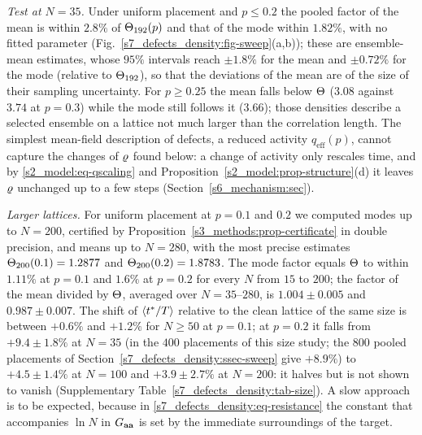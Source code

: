 \emph{Test at $N=35$.} Under uniform placement and $p\le0.2$ the pooled factor of the mean is within $2.8\%$ of
$\Theta_{192}(p)$ and that of the mode within $1.82\%$, with no fitted parameter (Fig.~\ref{s7_defects_density:fig-sweep}(a,b));
these are ensemble-mean estimates, whose $95\%$ intervals reach $\pm1.8\%$ for the mean and $\pm0.72\%$ for the mode
(relative to $\Theta_{192}$), so that the deviations of the mean are of the size of their sampling uncertainty.
For $p\ge0.25$ the mean falls below $\Theta$ ($3.08$ against $3.74$ at $p=0.3$) while the mode still follows it ($3.66$);
those densities describe a selected ensemble on a lattice not much larger than the correlation length. The simplest
mean-field description of defects, a reduced activity $q_{\mathrm{eff}}(p)$, cannot capture the changes of $\varrho$ found
below: a change of activity only rescales time, and by \eqref{s2_model:eq-qscaling} and
Proposition~\ref{s2_model:prop-structure}(d) it leaves $\varrho$ unchanged up to a few steps
(Section~\ref{s6_mechanism:sec}).

\emph{Larger lattices.} For uniform placement at $p=0.1$ and $0.2$ we computed modes up to $N=200$, certified by
Proposition~\ref{s3_methods:prop-certificate} in double precision, and means up to $N=280$, with the most precise estimates $\Theta_{200}(0.1)=1.2877$ and $\Theta_{200}(0.2)=1.8783$. The mode factor equals
$\Theta$ to within $1.11\%$ at $p=0.1$ and $1.6\%$ at $p=0.2$ for every $N$ from $15$ to $200$; the factor of the mean divided by
$\Theta$, averaged over $N=35$--$280$, is $1.004\pm0.005$ and $0.987\pm0.007$. The shift of $\langle t^{*}/T\rangle$ relative
to the clean lattice of the same size is between $+0.6\%$ and $+1.2\%$ for $N\ge50$ at $p=0.1$; at $p=0.2$ it falls from
$+9.4\pm1.8\%$ at $N=35$ (in the $400$ placements of this size study; the $800$ pooled placements of Section~\ref{s7_defects_density:ssec-sweep} give $+8.9\%$) to $+4.5\pm1.4\%$ at $N=100$ and $+3.9\pm2.7\%$ at $N=200$: it halves but is not shown to vanish
(Supplementary Table~\ref{s7_defects_density:tab-size}). A slow approach is to be expected, because in
\eqref{s7_defects_density:eq-resistance} the constant that accompanies $\ln N$ in $G_{\mathbf{a}\mathbf{a}}$ is set by the immediate
surroundings of the target.

